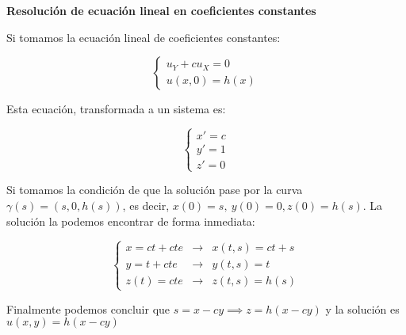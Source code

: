 \documentclass[openany]{book}
\begin{document}


\begin{example}
  \textbf{Resolución de ecuación lineal en coeficientes constantes}

  Si tomamos la ecuación lineal de coeficientes constantes:

  $$ \left\{
  \begin{array}{l}
    u_{Y}+cu_{X} = 0\\
    u(x,0) = h(x)
  \end{array}
  \right. $$
  
  Esta ecuación, transformada a un sistema es:
  
  $$ \left\{
  \begin{array}{l}
    x'=c\\ 
    y' = 1\\ 
    z'=0
  \end{array}
  \right. $$
  
  Si tomamos la condición de que la solución pase por la curva $ \gamma(s) = (s,0,h(s)) $, es decir, $ x(0) = s,\ y(0) = 0, z(0) = h(s) $. La solución la podemos encontrar de forma inmediata:
  
  $$ \left\{
  \begin{array}{lcl}
    x = ct+ cte & \to & x(t,s) = ct +s\\ 
    y = t + cte & \to &  y(t,s) = t \\ 
    z(t) = cte & \to &  z(t,s) = h(s)
  \end{array}
  \right. $$
  
  Finalmente podemos concluir que $ s = x -cy \implies z = h(x-cy) $ y la solución es $ u(x,y) = h(x-cy) $
  

\end{example}
\end{document}
